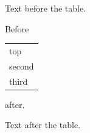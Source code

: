 \documentclass[12pt]{article}
\begin{document}
Text before the table.

Before \begin{tabular}[t]{l}top\\second\\third\end{tabular} after.

Text after the table.
\end{document}
